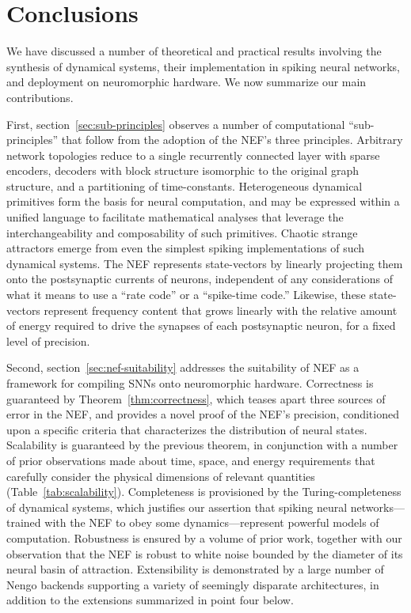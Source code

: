 \chapter{Conclusions}
\label{chapt:conclusions}

We have discussed a number of theoretical and practical results involving the synthesis of dynamical systems, their implementation in spiking neural networks, and deployment on neuromorphic hardware.
We now summarize our main contributions.

First, section~\ref{sec:sub-principles} observes a number of computational ``sub-principles'' that follow from the adoption of the NEF's three principles.
Arbitrary network topologies reduce to a single recurrently connected layer with sparse encoders, decoders with block structure isomorphic to the original graph structure, and a partitioning of time-constants.
Heterogeneous dynamical primitives form the basis for neural computation, and may be expressed within a unified language to facilitate mathematical analyses that leverage the interchangeability and composability of such primitives.
Chaotic strange attractors emerge from even the simplest spiking implementations of such dynamical systems.
The NEF represents state-vectors by linearly projecting them onto the postsynaptic currents of neurons,  independent of any considerations of what it means to use a ``rate code'' or a ``spike-time code.''
Likewise, these state-vectors represent frequency content that grows linearly with the relative amount of energy required to drive the synapses of each postsynaptic neuron, for a fixed level of precision.

Second, section~\ref{sec:nef-suitability} addresses the suitability of NEF as a framework for compiling SNNs onto neuromorphic hardware.
Correctness is guaranteed by Theorem~\ref{thm:correctness}, which teases apart three sources of error in the NEF, and provides a novel proof of the NEF's precision, conditioned upon a specific criteria that characterizes the distribution of neural states.
Scalability is guaranteed by the previous theorem, in conjunction with a number of prior observations made about time, space, and energy requirements that carefully consider the physical dimensions of relevant quantities (Table~\ref{tab:scalability}).
Completeness is provisioned by the Turing-completeness of dynamical systems, which justifies our assertion that spiking neural networks---trained with the NEF to obey some dynamics---represent powerful models of computation.
Robustness is ensured by a volume of prior work, together with our observation that the NEF is robust to white noise bounded by the diameter of its neural basin of attraction.
Extensibility is demonstrated by a large number of Nengo backends supporting a variety of seemingly disparate architectures, in addition to the extensions summarized in point four below.

